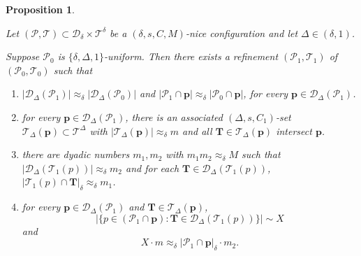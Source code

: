 \documentclass{amsart}
\newtheorem{prop}{Proposition}[section]
\newcommand{\bp}{\mathbf{p}}
\newcommand{\bT}{\mathbf{T}}
\newcommand{\cD}{\mathcal{D}}
\newcommand{\cT}{\mathcal{T}}
\newcommand{\cP}{\mathcal{P}}
\begin{document}
\begin{prop}\label{prop:incidence multiscale}

    Let $(\mathcal{P}, \mathcal{T}) \subset \mathcal{D}_\delta \times \mathcal{T}^\delta$ be a $(\delta, s, C, M)$-nice configuration and  let $\Delta\in (\delta, 1)$. 
    
    
    Suppose  $\cP_0$ is  $\{\delta, \Delta, 1\}$-uniform. %
    Then there exists a refinement $(\cP_1, \cT_1)$ of $(\cP_0, \cT_0)$ such that 
    \begin{enumerate}
        \item $|\mathcal{D}_{\Delta} (\mathcal{P}_1)| \approx_\delta |\mathcal{D}_{\Delta} (\mathcal{P}_0)|$ and $|\mathcal{P}_1 \cap \textbf{p}| \approx_\delta |\mathcal{P}_0 \cap \textbf{p}|$, for every   $\textbf{p} \in \mathcal{D}_{\Delta} (\mathcal{P}_1)$.

        \item for every $\textbf{p}\in \mathcal{D}_{\Delta}(\cP_1)$,  there is an associated $(\Delta, s, C_1)$-set $\cT_\Delta (\bp) \subset \cT^{\Delta}$ with $|\cT_\Delta (\bp)|\approx_{\delta}  m$ and all $\bT\in \cT_\Delta (\bp)$ intersect $\bp$. 
        
        \item there  are dyadic numbers $m_1, m_2$ with $m_1m_2\approx_{\delta} M$ such that 
        $|\cD_{\Delta}(\cT_1(p))|\approx_{\delta} m_{2}$ and for each $\bT \in \cD_{\Delta}(\cT_1(p))$,$
       | \cT_1(p)\cap \bT |_{\delta} \approx_{\delta} m_1$.
        \item for every $\bp\in \cD_{\Delta}(\cP_1)$ and  $\bT\in \cT_\Delta(\bp)$, 
        \[ |\{ p\in ( \cP_1\cap \bp): \bT\in \mathcal{D}_{\Delta} ( \cT_1(p))\} |\sim X\]
        and 
        \[
        X \cdot m \approx_{\delta} |\cP_1\cap \bp|_{\delta} \cdot m_2.
        \]
    \end{enumerate}
\end{prop}
\end{document}
